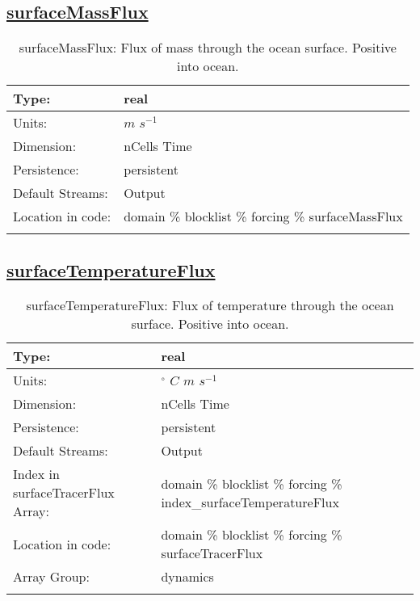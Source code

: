 \subsection[surfaceMassFlux]{\hyperref[sec:var_tab_forcing]{surfaceMassFlux}}
\label{subsec:var_sec_forcing_surfaceMassFlux}
\begin{center}
\begin{longtable}{| p{2.0in} | p{4.0in} |}
        \hline 
        Type: & real \\
        \hline 
        Units: & $m$ $s^{-1}$ \\
        \hline 
        Dimension: & nCells Time \\
        \hline 
        Persistence: & persistent \\
        \hline 
		 Default Streams: & Output  \\
        \hline 
		 Location in code: & domain \% blocklist \% forcing \% surfaceMassFlux \\
		 \hline 
    \caption{surfaceMassFlux: Flux of mass through the ocean surface. Positive into ocean.}
\end{longtable}
\end{center}
\subsection[surfaceTemperatureFlux]{\hyperref[sec:var_tab_forcing]{surfaceTemperatureFlux}}
\label{subsec:var_sec_forcing_surfaceTemperatureFlux}
\begin{center}
\begin{longtable}{| p{2.0in} | p{4.0in} |}
        \hline 
        Type: & real \\
        \hline 
        Units: & $^\circ$ $C$ $m$ $s^{-1}$ \\
        \hline 
        Dimension: & nCells Time \\
        \hline 
        Persistence: & persistent \\
        \hline 
		 Default Streams: & Output  \\
        \hline 
		 Index in surfaceTracerFlux Array: & domain \% blocklist \% forcing \% index\_surfaceTemperatureFlux \\
		 \hline 
		 Location in code: & domain \% blocklist \% forcing \% surfaceTracerFlux \\
		 \hline 
		 Array Group: & dynamics \\
		 \hline 
    \caption{surfaceTemperatureFlux: Flux of temperature through the ocean surface. Positive into ocean.}
\end{longtable}
\end{center}
